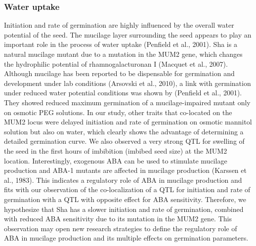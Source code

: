 \documentclass[8pt, twoside, a5paper]{report}
\begin{document}
\subsubsection{Water uptake}
Initiation and rate of germination are highly influenced by the overall water potential of the seed. The mucilage layer surrounding the seed appears to play an
important role in the process of water uptake (Penfield et al., 2001). Sha is a natural mucilage mutant due to a mutation in the MUM2 gene, which changes the hydrophilic
potential of rhamnogalacturonan I (Macquet et al., 2007). Although mucilage has been reported to be dispensable for germination and development under lab conditions
(Arsovski et al., 2010), a link with germination under reduced water potential conditions was shown by (Penfield et al., 2001). They showed reduced maximum germination of a
mucilage-impaired mutant only on osmotic PEG solutions. In our study, other traits that co-located on the MUM2 locus were delayed initiation and rate of germination on osmotic
mannitol solution but also on water, which clearly shows the advantage of determining a detailed germination curve. We also observed a very strong QTL for swelling of the seed
in the first hours of imbibition (imbibed seed size) at the MUM2 location. Interestingly, exogenous ABA can be used to stimulate mucilage production and ABA-1 mutants are
affected in mucilage production (Karssen et al., 1983). This indicates a regulatory role of ABA in mucilage production and fits with our observation of the co-localization of a QTL
for initiation and rate of germination with a QTL with opposite effect for ABA sensitivity. Therefore, we hypothesize that Sha has a slower initiation and rate of germination,
combined with reduced ABA sensitivity due to its mutation in the MUM2 gene. This observation may open new research strategies to define the regulatory role of ABA in
mucilage production and its multiple effects on germination parameters.
\end{document}
